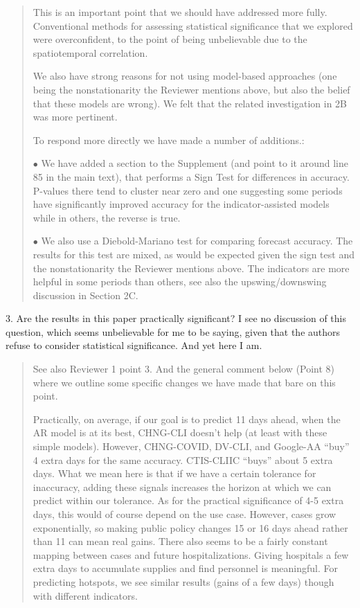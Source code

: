 \documentclass[11pt]{article}
\newenvironment{resp}{\begin{quote}\color{cobalt}}{\end{quote}}
\begin{document}
\begin{resp}
  This is an important point that we should have addressed more fully.
  Conventional methods for assessing statistical significance that we explored
  were overconfident, to the point of being unbelievable due to the
  spatiotemporal correlation. 

  We also have strong reasons for not using model-based approaches (one being the
  nonstationarity the Reviewer mentions above, but also the belief that these
  models are wrong). We felt that the related investigation in 2B was more
  pertinent.

  To respond more directly we have made a number of additions.:

  $\bullet$ We have added a section to the Supplement (and point
  to it around 
  line 85 in the main text), that performs a Sign Test for differences in
  accuracy. P-values there tend to cluster near zero and one suggesting some
  periods have significantly improved accuracy for the indicator-assisted models
  while in others, the reverse is true.

  $\bullet$ We also use a Diebold-Mariano test
  for comparing forecast accuracy. The results for this test are mixed, as would
  be expected given the sign test and
  the nonstationarity the Reviewer mentions above. The indicators are
  more helpful in some periods than others, see also the upswing/downswing
  discussion in Section 2C. 
\end{resp}

3. Are the results in this paper practically significant? I see no discussion of
this question, which seems unbelievable for me to be saying, given that the
authors refuse to consider statistical significance. And yet here I am.

\begin{resp}
  See also Reviewer 1 point 3. And the general comment below (Point 8) where we
  outline some specific changes we have made that bare on this point.
  
  Practically, on average, if our goal is to predict 11 days ahead, when the AR
  model is at its best, CHNG-CLI
  doesn’t help (at least with these simple models). However, CHNG-COVID,
  DV-CLI, and Google-AA ``buy'' 4 extra days for the 
  same accuracy. CTIS-CLIIC ``buys'' about 5 extra days. What we mean here is
  that if we have a certain tolerance for inaccuracy, adding these signals increases the
  horizon at which we can predict within our tolerance. As for the
  practical significance of 4-5 extra days, this would of course depend on the use case.  However, cases grow
  exponentially, so making public policy changes 15 or 16 days ahead rather than
  11 can mean real gains. There also seems to be a fairly constant mapping
  between cases and future hospitalizations. Giving
  hospitals a few extra days to accumulate supplies and find personnel is
  meaningful. For predicting hotspots, we see similar results (gains of a few
  days) though with different indicators. 
\end{resp}
\end{document}
